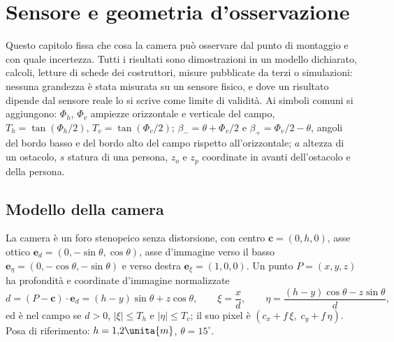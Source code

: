 \section{Sensore e geometria d'osservazione}\label{sec:geo}

Questo capitolo fissa che cosa la camera può osservare dal punto di montaggio e con quale incertezza. Tutti i risultati sono dimostrazioni in un modello dichiarato, calcoli, letture di schede dei costruttori, misure pubblicate da terzi o simulazioni: nessuna grandezza è stata misurata su un sensore fisico, e dove un risultato dipende dal sensore reale lo si scrive come limite di validità. Ai simboli comuni si aggiungono: $\Phi_h$, $\Phi_v$ ampiezze orizzontale e verticale del campo, $T_h=\tan(\Phi_h/2)$, $T_v=\tan(\Phi_v/2)$; $\beta_-=\theta+\Phi_v/2$ e $\beta_+=\Phi_v/2-\theta$, angoli del bordo basso e del bordo alto del campo rispetto all'orizzontale; $a$ altezza di un ostacolo, $s$ statura di una persona, $z_o$ e $z_p$ coordinate in avanti dell'ostacolo e della persona.

\subsection{Modello della camera}\label{sec:geo-camera}

\begin{definizione}[Camera]\label{def:geo-camera}
La camera è un foro stenopeico senza distorsione, con centro $\mathbf c=(0,h,0)$, asse ottico $\mathbf e_d=(0,-\sin\theta,\cos\theta)$, asse d'immagine verso il basso $\mathbf e_\eta=(0,-\cos\theta,-\sin\theta)$ e verso destra $\mathbf e_\xi=(1,0,0)$. Un punto $P=(x,y,z)$ ha profondità e coordinate d'immagine normalizzate
\begin{equation}\label{eq:geo-proiezione}
d=(P-\mathbf c)\cdot\mathbf e_d=(h-y)\sin\theta+z\cos\theta,\qquad \xi=\frac{x}{d},\qquad \eta=\frac{(h-y)\cos\theta-z\sin\theta}{d},
\end{equation}
ed è nel campo se $d>0$, $|\xi|\le T_h$ e $|\eta|\le T_v$; il suo pixel è $(c_x+f\,\xi,\;c_y+f\,\eta)$. Posa di riferimento: $h=1{,}2\unita{m}$, $\theta=15^\circ$.
\end{definizione}

